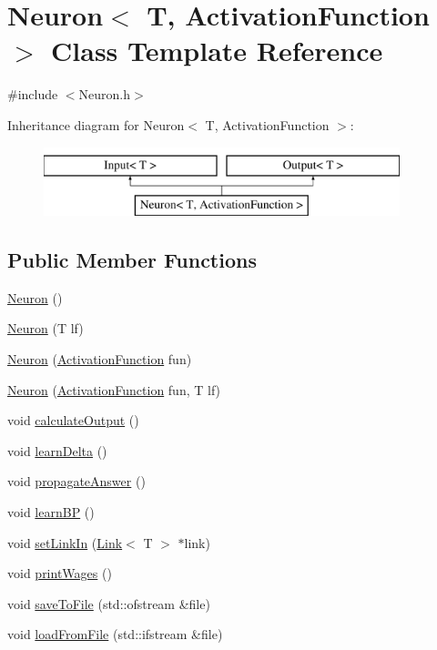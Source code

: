 \hypertarget{class_neuron}{\section{\-Neuron$<$ \-T, \-Activation\-Function $>$ \-Class \-Template \-Reference}
\label{class_neuron}
}


{\ttfamily \#include $<$\-Neuron.\-h$>$}

\-Inheritance diagram for \-Neuron$<$ \-T, \-Activation\-Function $>$\-:\begin{figure}[H]
\begin{center}
\leavevmode
\includegraphics[height=2.000000cm]{class_neuron}
\end{center}
\end{figure}
\subsection*{\-Public \-Member \-Functions}
\begin{DoxyCompactItemize}
\item 
\hyperlink{class_neuron_ada8bb503f1bd56ce2596eabf8c21877e}{\-Neuron} ()
\item 
\hyperlink{class_neuron_a6145b98854c0fb6e9cfe09336952a5dc}{\-Neuron} (\-T lf)
\item 
\hyperlink{class_neuron_afff69f38459625c7d376e5f5e2e34a9d}{\-Neuron} (\hyperlink{class_activation_function}{\-Activation\-Function} fun)
\item 
\hyperlink{class_neuron_a1c7ea1b973546b185e6ec0c29b740453}{\-Neuron} (\hyperlink{class_activation_function}{\-Activation\-Function} fun, \-T lf)
\item 
void \hyperlink{class_neuron_a36c60982cb604f2fa6a1765177a9c2e7}{calculate\-Output} ()
\item 
void \hyperlink{class_neuron_ae73a056c55311521d0e31347837109cc}{learn\-Delta} ()
\item 
void \hyperlink{class_neuron_acb55ff03a770877b6afb86ed4d06896a}{propagate\-Answer} ()
\item 
void \hyperlink{class_neuron_a5e479fce295d76be68c017ab8c986f8c}{learn\-B\-P} ()
\item 
void \hyperlink{class_neuron_a1a20d9ac9bf64126f8d74d8c1c7d3c58}{set\-Link\-In} (\hyperlink{class_link}{\-Link}$<$ \-T $>$ $\ast$link)
\item 
void \hyperlink{class_neuron_ac112e85f169835dad11a6f7bd9e477b9}{print\-Wages} ()
\item 
void \hyperlink{class_neuron_a335b33e8c65ce8975472ff577a12dce5}{save\-To\-File} (std\-::ofstream \&file)
\item 
void \hyperlink{class_neuron_a6471332d3b91b31988c861b96b23ddf1}{load\-From\-File} (std\-::ifstream \&file)
\end{DoxyCompactItemize}



